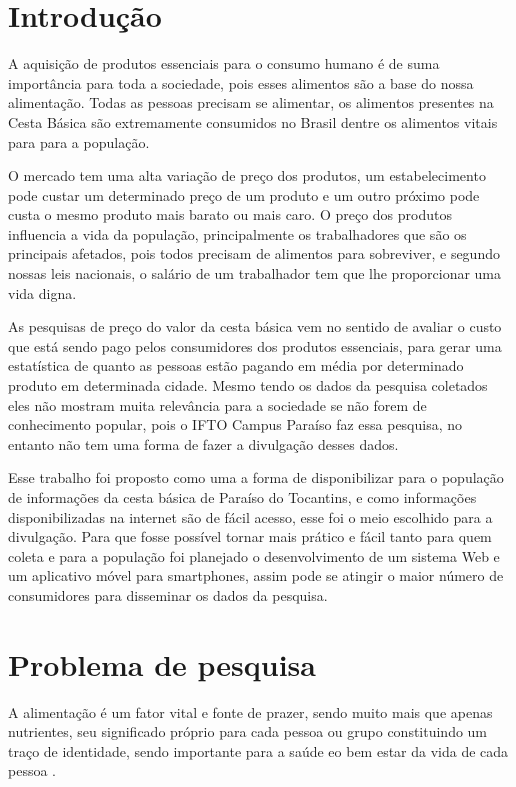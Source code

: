 \documentclass{ifto-tex}
\begin{document}
\textual

\chapter{Introdução}

A aquisição de produtos essenciais para o consumo humano é de suma importância para toda a sociedade, pois esses alimentos são a base do nossa alimentação. Todas as pessoas precisam se alimentar, os alimentos presentes na Cesta Básica são extremamente consumidos no Brasil dentre os alimentos vitais para para a população.

O mercado tem uma alta variação de preço dos produtos, um estabelecimento pode custar um determinado preço de um produto e um outro próximo pode custa o mesmo produto mais barato ou mais caro. O preço dos produtos influencia a vida da população, principalmente os trabalhadores que são os principais afetados, pois todos precisam de alimentos para sobreviver, e segundo nossas leis nacionais, o salário de um trabalhador tem que lhe proporcionar uma vida digna.

As pesquisas de preço do valor da cesta básica vem no sentido de avaliar o custo que está sendo pago pelos consumidores dos produtos essenciais, para gerar uma estatística de quanto as pessoas estão pagando em média por determinado produto em determinada cidade. Mesmo tendo os dados da pesquisa coletados eles não mostram muita relevância para a sociedade se não forem de conhecimento popular, pois o IFTO Campus Paraíso faz essa pesquisa, no entanto não tem uma forma de fazer a divulgação desses dados.

Esse trabalho foi proposto como uma a forma de disponibilizar para o população de informações da cesta básica de Paraíso do Tocantins, e como informações disponibilizadas na internet são de fácil acesso, esse foi o meio escolhido para a divulgação. Para que fosse possível tornar mais prático e fácil tanto para quem coleta e para a população foi planejado o desenvolvimento de um sistema Web e um aplicativo móvel para smartphones, assim pode se atingir o maior número de consumidores para disseminar os dados da pesquisa.

	
	

\chapter{Problema de pesquisa}
	
		A alimentação é um fator vital e fonte de prazer, sendo muito mais que apenas nutrientes, seu significado próprio para cada pessoa ou grupo constituindo um traço de identidade, sendo importante para a saúde eo bem estar da vida de cada pessoa \cite{loureiro2004importancia}.
		
\end{document}
